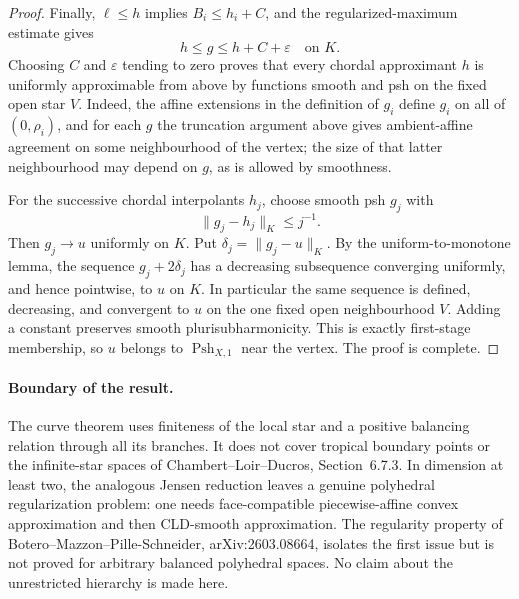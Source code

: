 \begin{proof}
Finally, $\ell\leq h$ implies $B_i\leq h_i+C$, and the regularized-maximum
estimate gives
\[
                         h\leq g\leq h+C+\varepsilon
                         \quad\text{on }K.
\]
Choosing $C$ and $\varepsilon$ tending to zero proves that every chordal
approximant $h$ is uniformly approximable from above by functions smooth
and psh on the fixed open star $V$.  Indeed, the affine extensions in the
definition of $g_i$ define $g_i$ on all of $(0,\rho_i)$, and for each $g$
the truncation argument above gives ambient-affine agreement on some
neighbourhood of the vertex; the size of that latter neighbourhood may
depend on $g$, as is allowed by smoothness.

For the successive chordal interpolants $h_j$, choose smooth psh $g_j$ with
\[
                         \lVert g_j-h_j\rVert_K\leq j^{-1}.
\]
Then $g_j\to u$ uniformly on $K$.  Put
$\delta_j=\lVert g_j-u\rVert_K$.  By the uniform-to-monotone lemma, the
sequence $g_j+2\delta_j$ has a decreasing subsequence converging uniformly,
and hence pointwise, to $u$ on $K$.  In particular the same sequence is
defined, decreasing, and convergent to $u$ on the one fixed open
neighbourhood $V$.  Adding a constant preserves smooth
plurisubharmonicity.  This is exactly first-stage membership, so $u$ belongs
to $\operatorname{Psh}_{X,1}$ near the vertex.  The proof is complete.
\end{proof}

\paragraph{Boundary of the result.}
The curve theorem uses finiteness of the local star and a positive balancing
relation through all its branches.  It does not cover tropical boundary
points or the infinite-star spaces of Chambert--Loir--Ducros, Section~6.7.3.
In dimension at least two, the analogous Jensen reduction leaves a genuine
polyhedral regularization problem: one needs face-compatible
piecewise-affine convex approximation and then CLD-smooth approximation.
The regularity property of Botero--Mazzon--Pille-Schneider,
arXiv:2603.08664, isolates the first issue but is not proved for arbitrary
balanced polyhedral spaces.  No claim about the unrestricted hierarchy is
made here.
